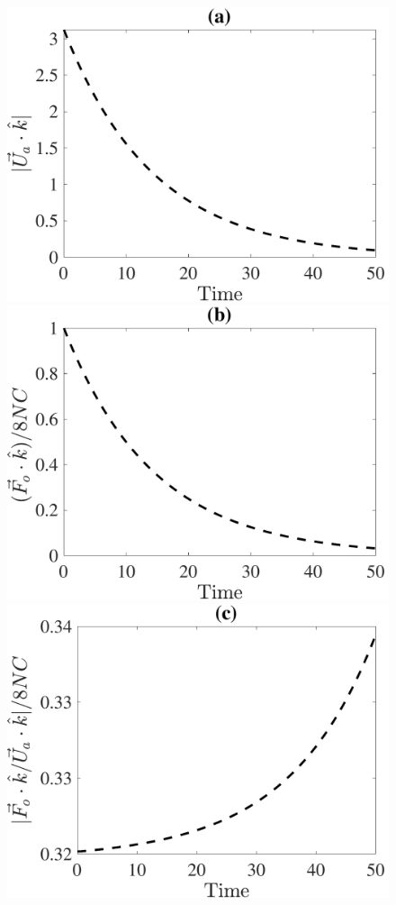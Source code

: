 \begin{figure}[ht]
	\begin{center}
		\includegraphics[scale=0.35]{./figures/fig_NC50_bs_Ua3_all.pdf}
		\includegraphics[scale=0.35]{./figures/fig_NC50_bs_Fo3_all}
		\includegraphics[scale=0.35]{./figures/fig_NC50_bs_Fo3Ua_ratio}

\end{center}
\end{figure}
